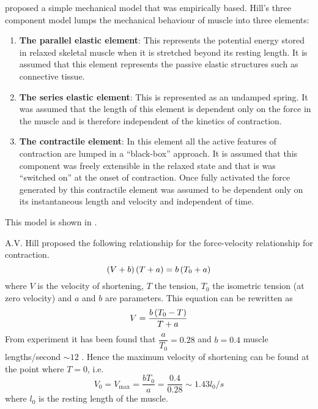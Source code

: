 \citet{hill:1938} proposed a simple mechanical model that was empirically
based.  Hill's three component model lumps the mechanical behaviour of muscle
into three elements:
\begin{enumerate}
\item \textbf{The parallel elastic element}: This represents the potential
  energy stored in relaxed skeletal muscle when it is stretched beyond its
  resting length. It is assumed that this element represents the passive
  elastic structures such as connective tissue.
\item \textbf{The series elastic element}: This is represented as an undamped
  spring. It was assumed that the length of this element is dependent only on
  the force in the muscle and is therefore independent of the kinetics of
  contraction.
\item \textbf{The contractile element}: In this element all the active features
  of contraction are lumped in a ``black-box'' approach. It is assumed that
  this component was freely extensible in the relaxed state and that is was
  ``switched on'' at the onset of contraction. Once fully activated the force
  generated by this contractile element was assumed to be dependent only on its
  instantaneous length and velocity and independent of time.
\end{enumerate}

This model is shown in .


A.V. Hill proposed the following relationship for the force-velocity
relationship for contraction.
\begin{equation}
  \left( V+b \right)\left( T+a \right)=b\left( T_{0}+a \right)
  \label{eqn:Hillforcevelocity}
\end{equation}
where $V$ is the velocity of shortening, $T$ the tension, $T_{0}$ the
isometric tension (at zero velocity) and $a$ and $b$ are parameters. This
equation can be rewritten as
\begin{equation}
  V=\dfrac{b\left( T_{0}-T \right)}{T+a}
  \label{eqn:Hillvelocity}
\end{equation}
From experiment it has been found that $\dfrac{a}{T_{0}}=0.28$ and $b=0.4$
muscle lengths/second $\sim 12$ \mmps. Hence the maximum velocity of
shortening can be found at the point where $T=0$, i.e.
\begin{equation}
  V_{0}=V_{\text{max}}=\dfrac{bT_{0}}{a}=\dfrac{0.4}{0.28}\sim 1.43 l_{0}/s
\end{equation}
where $l_{0}$ is the resting length of the muscle.

